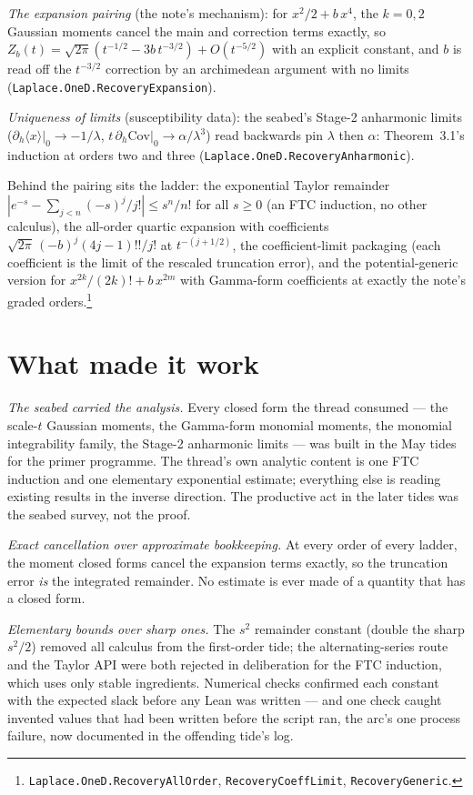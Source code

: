\documentclass[11pt]{article}
\begin{document}
\emph{The expansion pairing} (the note's mechanism): for
$x^2/2 + b\,x^4$, the $k = 0, 2$ Gaussian moments cancel the main and
correction terms exactly, so
$Z_b(t) = \sqrt{2\pi}(t^{-1/2} - 3b\,t^{-3/2}) + O(t^{-5/2})$ with an
explicit constant, and $b$ is read off the $t^{-3/2}$ correction by an
archimedean argument with no limits
(\texttt{Laplace.OneD.RecoveryExpansion}).

\emph{Uniqueness of limits} (susceptibility data): the seabed's Stage-2
anharmonic limits ($\partial_h\langle x\rangle|_0 \to -1/\lambda$,
$t\,\partial_h\mathrm{Cov}|_0 \to \alpha/\lambda^3$) read backwards pin
$\lambda$ then $\alpha$: Theorem~3.1's induction at orders two and
three (\texttt{Laplace.OneD.RecoveryAnharmonic}).

Behind the pairing sits the ladder: the exponential Taylor remainder
$|e^{-s} - \sum_{j<n}(-s)^j/j!| \leq s^n/n!$ for all $s \geq 0$ (an FTC
induction, no other calculus), the all-order quartic expansion with
coefficients $\sqrt{2\pi}\,(-b)^j(4j-1)!!/j!$ at $t^{-(j+1/2)}$, the
coefficient-limit packaging (each coefficient is the limit of the
rescaled truncation error), and the potential-generic version for
$x^{2k}/(2k)! + b\,x^{2m}$ with Gamma-form coefficients at exactly the
note's graded orders.\footnote{\texttt{Laplace.OneD.RecoveryAllOrder},
\texttt{RecoveryCoeffLimit}, \texttt{RecoveryGeneric}.}

\section{What made it work}

\emph{The seabed carried the analysis.} Every closed form the thread
consumed --- the scale-$t$ Gaussian moments, the Gamma-form monomial
moments, the monomial integrability family, the Stage-2 anharmonic
limits --- was built in the May tides for the primer programme. The
thread's own analytic content is one FTC induction and one elementary
exponential estimate; everything else is reading existing results in
the inverse direction. The productive act in the later tides was the
seabed survey, not the proof.

\emph{Exact cancellation over approximate bookkeeping.} At every order
of every ladder, the moment closed forms cancel the expansion terms
exactly, so the truncation error \emph{is} the integrated remainder.
No estimate is ever made of a quantity that has a closed form.

\emph{Elementary bounds over sharp ones.} The $s^2$ remainder constant
(double the sharp $s^2/2$) removed all calculus from the first-order
tide; the alternating-series route and the Taylor API were both
rejected in deliberation for the FTC induction, which uses only stable
ingredients. Numerical checks confirmed each constant with the expected
slack before any Lean was written --- and one check caught invented
values that had been written before the script ran, the arc's one
process failure, now documented in the offending tide's log.
\end{document}
